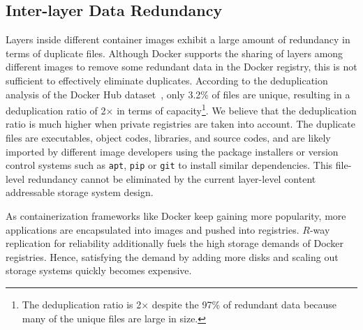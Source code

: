 \subsection{Inter-layer Data Redundancy}
\label{sec:inter-layer-deduplication}

Layers inside different container images exhibit a large amount of redundancy
in terms of duplicate files.
%
Although Docker
supports the sharing of layers among different images to remove some redundant data in the
Docker registry,
this is not sufficient to effectively eliminate duplicates.
%
According to the deduplication analysis of the Docker Hub
dataset~\cite{dedupanalysis}, only 3.2\% of files are unique, resulting in
a deduplication ratio of 2$\times$ in terms of
capacity\footnote{The deduplication ratio is 2$\times$ despite the 97\% of redundant data
because many of the unique files are large in size.}.
%
We believe that the deduplication ratio is much higher when
private registries are taken into account.
%
The duplicate files
are executables, object codes, libraries, and
source codes, and are likely imported by different image developers using the
package installers or version control systems such as \texttt{apt},
\texttt{pip} or \texttt{git} to install similar dependencies.
%
This file-level redundancy cannot be eliminated by the current layer-level content addressable
storage system design.

As containerization frameworks like Docker keep gaining more
popularity, more applications are encapsulated into images and pushed into
registries.
%
$R$-way replication for reliability additionally fuels the high storage demands
of Docker registries.
%
Hence, satisfying the demand by adding more disks and scaling out storage systems
quickly becomes expensive.
 
